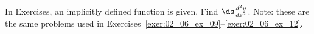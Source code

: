 \begin{exerciseset}{In Exercises}{, an implicitly defined function is given. Find $\ds \frac{d^2y}{dx^2}$. Note: these are the same problems used in Exercises~\ref{exer:02_06_ex_09}--\ref{exer:02_06_ex_12}.}





\end{exerciseset}

